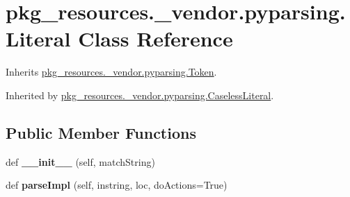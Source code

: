 \hypertarget{classpkg__resources_1_1__vendor_1_1pyparsing_1_1_literal}{}\section{pkg\+\_\+resources.\+\_\+vendor.\+pyparsing.\+Literal Class Reference}
\label{classpkg__resources_1_1__vendor_1_1pyparsing_1_1_literal}


Inherits \hyperlink{classpkg__resources_1_1__vendor_1_1pyparsing_1_1_token}{pkg\+\_\+resources.\+\_\+vendor.\+pyparsing.\+Token}.



Inherited by \hyperlink{classpkg__resources_1_1__vendor_1_1pyparsing_1_1_caseless_literal}{pkg\+\_\+resources.\+\_\+vendor.\+pyparsing.\+Caseless\+Literal}.

\subsection*{Public Member Functions}
\begin{DoxyCompactItemize}
\item 
\mbox{\label{classpkg__resources_1_1__vendor_1_1pyparsing_1_1_literal_a84998933148a451f733fc5c60058f6ad}} 
def {\bfseries \+\_\+\+\_\+init\+\_\+\+\_\+} (self, match\+String)
\item 
\mbox{\label{classpkg__resources_1_1__vendor_1_1pyparsing_1_1_literal_a9cfffbc7224a82b98c5ee7bbdce631e0}} 
def {\bfseries parse\+Impl} (self, instring, loc, do\+Actions=True)
\end{DoxyCompactItemize}
